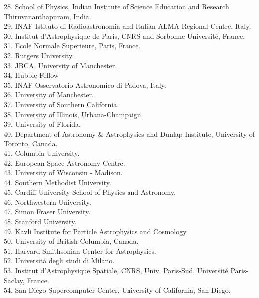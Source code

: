 \documentclass[PICOAPC.tex]{subfiles}
\begin{document}
\begin{multicols}{2}
{28. School of Physics, Indian Institute of Science Education and Research Thiruvananthapuram, India.  \\
29. INAF-Istituto di Radioastronomia and Italian ALMA Regional Centre, Italy.  \\
30. Institut d'Astrophysique de Paris, CNRS and Sorbonne Universit\'e, France.  \\
31. Ecole Normale Superieure, Paris, France.  \\
32. Rutgers University.  \\
33. JBCA, University of Manchester.  \\
34. Hubble Fellow          \\
35. INAF-Osservatorio Astronomico di Padova, Italy.  \\
36. University of Manchester.  \\
37. University of Southern California.  \\
38. University of Illinois, Urbana-Champaign.  \\
39. University of Florida.  \\
40. Department of Astronomy \& Astrophysics and Dunlap Institute, University of Toronto, Canada.  \\
41. Columbia University.  \\
42. European Space Astronomy Centre.  \\
43. University of Wisconsin - Madison.  \\
44. Southern Methodist University.  \\
45. Cardiff University School of Physics and Astronomy.  \\
46. Northwestern University.  \\
47. Simon Fraser University.  \\
48. Stanford University.  \\
49. Kavli Institute for Particle Astrophysics and Cosmology.  \\
50. University of British Columbia, Canada.  \\
51. Harvard-Smithsonian Center for Astrophysics.  \\
52. Universit\`a degli studi di Milano.  \\
53. Institut d'Astrophysique Spatiale, CNRS, Univ. Paris-Sud, Universit\'e Paris-Saclay, France.  \\
54. San Diego Supercomputer Center, University of California, San Diego.
}
\end{multicols}

\vskip -7pt
\end{document}
